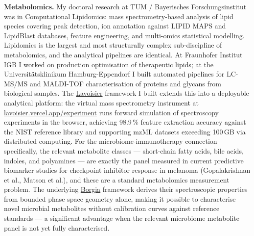 \documentclass[12pt,a4paper]{article}
\begin{document}
\textbf{Metabolomics.}
My doctoral research at TUM / Bayerisches Forschungsinstitut was in Computational
Lipidomics: mass spectrometry-based analysis of lipid species covering peak
detection, ion annotation against LIPID MAPS and LipidBlast databases, feature
engineering, and multi-omics statistical modelling. Lipidomics is the largest
and most structurally complex sub-discipline of metabolomics, and the analytical
pipelines are identical. At Fraunhofer Institut IGB I worked on production
optimisation of therapeutic lipids; at the Universitätsklinikum Hamburg-Eppendorf
I built automated pipelines for LC-MS/MS and MALDI-TOF characterisation of
proteins and glycans from biological samples.
The \href{https://github.com/fullscreen-triangle/lavoisier}{Lavoisier} framework
I built extends this into a deployable analytical platform: the virtual mass
spectrometry instrument at
\href{https://lavoisier.vercel.app/experiment}{lavoisier.vercel.app/experiment}
runs forward simulation of spectroscopy experiments in the browser, achieving
98.9\,\% feature extraction accuracy against the NIST reference library
and supporting mzML datasets exceeding 100\,GB via distributed computing.
For the microbiome-immunotherapy connection specifically, the relevant metabolite
classes --- short-chain fatty acids, bile acids, indoles, and polyamines --- are
exactly the panel measured in current predictive biomarker studies for checkpoint
inhibitor response in melanoma (Gopalakrishnan et al., Matson et al.), and these
are a standard metabolomics measurement problem. The underlying
\href{https://github.com/fullscreen-triangle/borgia}{Borgia} framework derives
their spectroscopic properties from bounded phase space geometry alone, making it
possible to characterise novel microbial metabolites without calibration curves
against reference standards --- a significant advantage when the relevant
microbiome metabolite panel is not yet fully characterised.
\end{document}
